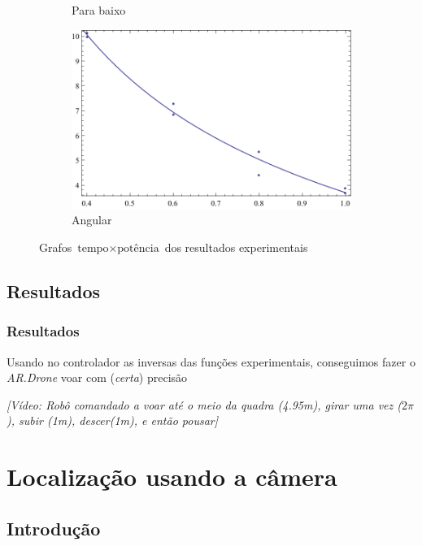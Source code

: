 \documentclass[]{beamer}
\begin{document}
\begin{frame}
\begin{figure}
\begin{subfigure}[b]{0.4\textwidth}
	\caption{Para baixo}
\end{subfigure}
\begin{subfigure}[b]{0.4\textwidth}
	\centering
	\includegraphics[width=\textwidth]{images/regressionAngular.pdf}
	\caption{Angular}
\end{subfigure}
\caption{Grafos $\text{tempo} \times \text{potência}$ dos resultados experimentais}
\end{figure}
\end{frame}

\subsection{Resultados}

\begin{frame}
\frametitle{Resultados}

Usando no controlador as inversas das funções experimentais, conseguimos fazer o \emph{AR.Drone} voar com (\emph{certa}) precisão
\vspace{3.0ex}
\begin{center}
\emph{[Vídeo: Robô comandado a voar até o meio da quadra (4.95m), girar uma vez ($2\pi$), subir (1m), descer(1m), e então pousar]}
\end{center}
\end{frame}

\section{Localização usando a câmera}

\subsection{Introdução}
\end{document}
